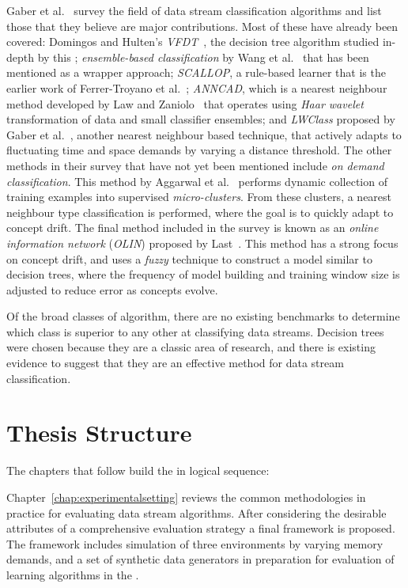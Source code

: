 Gaber et al.~\cite{dssurvey} survey the field of data stream classification algorithms and list those that they believe are major contributions. Most of these have already been covered: Domingos and Hulten's {\em VFDT}~\cite{vfdt}, the decision tree algorithm studied in-depth by this \thesis; {\em ensemble-based classification} by Wang et al.~\cite{cdensemble} that has been mentioned as a wrapper approach; {\em SCALLOP}, a rule-based learner that is the earlier work of Ferrer-Troyano et al.~\cite{scallop}; {\em ANNCAD}, which is a nearest neighbour method developed by Law and Zaniolo~\cite{anncad} that operates using {\em Haar wavelet} transformation of data and small classifier ensembles; and {\em LWClass} proposed by Gaber et al.~\cite{lwclass}, another nearest neighbour based technique, that actively adapts to fluctuating time and space demands by varying a distance threshold. The other methods in their survey that have not yet been mentioned include {\em on demand classification}. This method by Aggarwal et al.~\cite{ondemand} performs dynamic collection of training examples into supervised {\em micro-clusters}. From these clusters, a nearest neighbour type classification is performed, where the goal is to quickly adapt to concept drift. The final method included in the survey is known as an {\em online information network} ({\em OLIN}) proposed by Last~\cite{olin}. This method has a strong focus on concept drift, and uses a {\em fuzzy} technique to construct a model similar to decision trees, where the frequency of model building and training window size is adjusted to reduce error as concepts evolve.

\BEGINOMIT
Of the broad classes of algorithm, there are no existing benchmarks to determine which class is superior to any other at classifying data streams. Decision trees were chosen because they are a classic area of research, and there is existing evidence to suggest that they are an effective method for data stream classification.


\section{Thesis Structure}

The chapters that follow build the \thesis in logical sequence:

Chapter~\ref{chap:experimentalsetting} reviews the common methodologies in practice for evaluating data stream algorithms. After considering the desirable attributes of a comprehensive evaluation strategy a final framework is proposed. The framework includes simulation of three environments by varying memory demands, and a set of synthetic data generators in preparation for evaluation of  learning algorithms in the \thesis.

